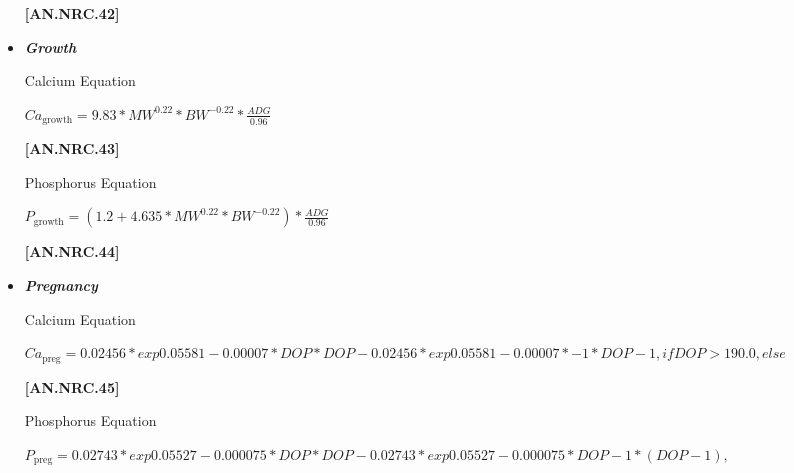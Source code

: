 \begin{refsection}
\begin{itemize}
\vspace{0.5cm}
            {\raggedleft \textbf{[AN.NRC.42]}\par}
\vspace{0.5cm}

        \item \textbf{\textit{Growth}} 
\vspace{0.2cm}

Calcium Equation
\begin{center}
    \(Ca_{\text{growth}} = 9.83 * MW^{0.22} * BW^{-0.22} * \frac{ADG}{0.96}\)
\end{center}

\vspace{0.5cm}
            {\raggedleft \textbf{[AN.NRC.43]}\par}
            
\vspace{0.5cm}
Phosphorus Equation
\vspace{0.2cm}
                
\begin{center}
    \(P_{\text{growth}} = (1.2 + 4.635 * MW^{0.22} * BW^{-0.22}) * \frac{ADG}{0.96} \) 
\end{center}
\vspace{0.5cm}
            {\raggedleft \textbf{[AN.NRC.44]}\par}
\vspace{0.5cm}

            
        \item \textbf{\textit{Pregnancy}}  
\vspace{0.2cm}

Calcium Equation

\begin{center}
    \(Ca_{\text{preg}} = 0.02456 * exp0.05581 - 0.00007 * DOP * DOP - 0.02456 * exp0.05581 - 0.00007 * - 1 * DOP - 1, if DOP > 190.0, else\)
\end{center}

\vspace{0.5cm}
            {\raggedleft \textbf{[AN.NRC.45]}\par}
\vspace{0.5cm}

Phosphorus Equation
                
\begin{center}
    \(P_{\text{preg}} = 0.02743 * exp 0.05527 - 0.000075 * DOP * DOP - 0.02743 * exp0.05527 - 0.000075 * DOP - 1 * (DOP - 1),\) \\
    \vspace{0.2cm}
    

\end{center}
\end{itemize}
\end{refsection}

